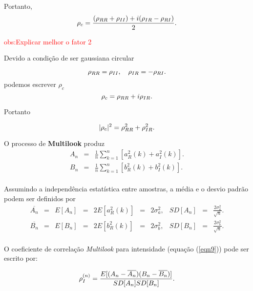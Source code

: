 Portanto, 
\begin{equation}\label{eqn16}
	\rho_c=\frac{(\rho_{RR}+\rho_{II})+i(\rho_{IR}-\rho_{RI})}{2}. \\
\end{equation}

\textcolor{red}{obs:Explicar melhor o fator 2}

Devido a condição de ser gaussiana circular

\begin{equation}\label{eqn17}
	\rho_{RR}=\rho_{II},\quad \rho_{IR}=-\rho_{RI}. \\
\end{equation}
podemos escrever $\rho_c$
\begin{equation}\label{eqn18}
	\rho_c=\rho_{RR}+i\rho_{IR}. \\
\end{equation}

Portanto

\begin{equation}\label{eqn19}
	|\rho_c|^2=\rho_{RR}^2+\rho_{IR}^2. \\
\end{equation}

O processo de {\bf Multilook} produz
\begin{equation}\label{eqn20}
\begin{array}{ccc}
	A_n&=&\frac{1}{n}\sum_{k=1}^{n} [a_{R}^2(k)+a_{I}^2(k)]. \\
	B_n&=&\frac{1}{n}\sum_{k=1}^{n} [b_{R}^2(k)+b_{I}^2(k)]. \\
\end{array}
\end{equation}

Assumindo a independência estatística entre amostras, a média e o desvio padrão podem ser definidos por
\begin{equation}\label{eqn21}
\begin{array}{cccccccccccc}
	\overline{A_n}&=&E[A_n]&=&2E[a_{R}^2(k)]&=&2\sigma_a^2,&SD[A_n]&=&\frac{2\sigma_a^2}{\sqrt{n}}.\\
	\overline{B_n}&=&E[B_n]&=&2E[b_{R}^2(k)]&=&2\sigma_b^2,&SD[B_n]&=&\frac{2\sigma_b^2}{\sqrt{n}}.\\
\end{array}
\end{equation}

O coeficiente de correlação {\it Multilook} para intensidade (equação (\ref{eqn9})) pode ser escrito por:

\begin{equation}\label{eqn22}
	\rho_I^{(n)}=\frac{E[(A_n-\overline{A_n})(B_n-\overline{B_n})]}{SD[A_n]SD[B_n]}. \\
\end{equation}


